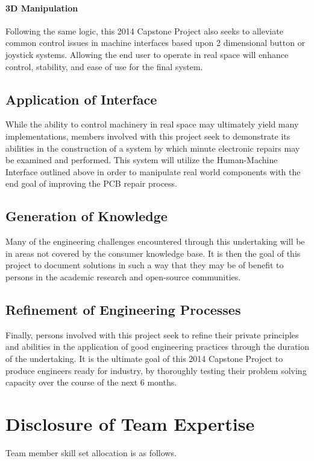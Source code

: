 \documentclass[11pt]{report}
\begin{document}
\paragraph{3D Manipulation}
Following the same logic, this 2014 Capstone Project also seeks to alleviate common control issues in machine interfaces based upon 2 dimensional button or joystick systems. Allowing the end user to operate in real space will enhance control, stability, and ease of use for the final system.

\subsection{Application of Interface}
\par While the ability to control machinery in real space may ultimately yield many implementations, members involved with this project seek to demonstrate its abilities in the construction of a system by which minute electronic repairs may be examined and performed. This system will utilize the Human-Machine Interface outlined above in order to manipulate real world components with the end goal of improving the PCB repair process.

\subsection{Generation of Knowledge}
\par Many of the engineering challenges encountered through this undertaking will be in areas not covered by the consumer knowledge base. It is then the goal of this project to document solutions in such a way that they may be of benefit to persons in the academic research and open-source communities.

\subsection{Refinement of Engineering Processes}
\par Finally, persons involved with this project seek to refine their private principles and abilities in the application of good engineering practices through the duration of the undertaking. It is the ultimate goal of this 2014 Capstone Project to produce engineers ready for industry, by thoroughly testing their problem solving capacity over the course of the next 6 months.

\section{Disclosure of Team Expertise}
Team member skill set allocation is as follows.
\end{document}
